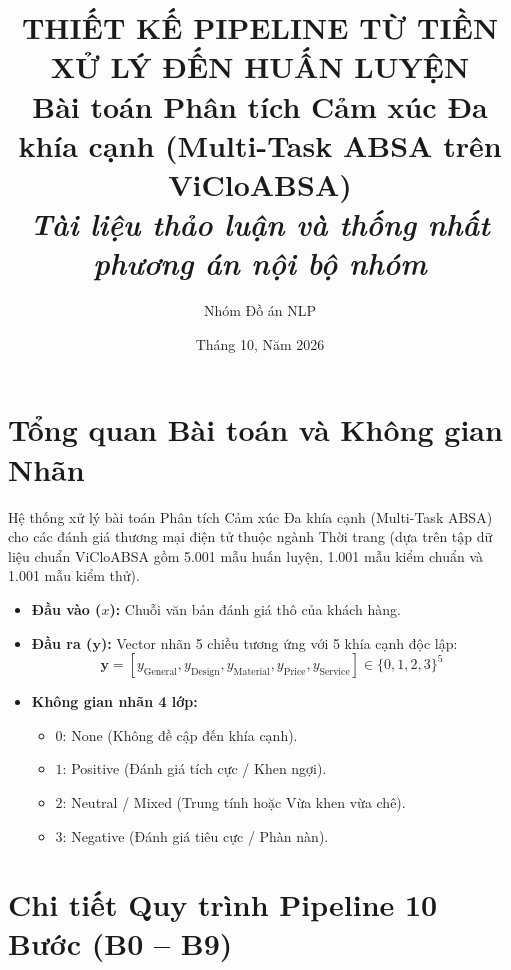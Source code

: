 \documentclass[11pt,a4paper]{article}
\begin{document}
\title{\textbf{\Large THIẾT KẾ PIPELINE TỪ TIỀN XỬ LÝ ĐẾN HUẤN LUYỆN}\\
\large Bài toán Phân tích Cảm xúc Đa khía cạnh (Multi-Task ABSA trên ViCloABSA)\\
\normalsize \textit{Tài liệu thảo luận và thống nhất phương án nội bộ nhóm}}
\author{Nhóm Đồ án NLP}
\date{Tháng 10, Năm 2026}
\maketitle

\section{Tổng quan Bài toán và Không gian Nhãn}
Hệ thống xử lý bài toán Phân tích Cảm xúc Đa khía cạnh (Multi-Task ABSA) cho các đánh giá thương mại điện tử thuộc ngành Thời trang (dựa trên tập dữ liệu chuẩn ViCloABSA gồm 5.001 mẫu huấn luyện, 1.001 mẫu kiểm chuẩn và 1.001 mẫu kiểm thử).

\begin{itemize}
    \item \textbf{Đầu vào ($x$):} Chuỗi văn bản đánh giá thô của khách hàng.
    \item \textbf{Đầu ra ($\mathbf{y}$):} Vector nhãn 5 chiều tương ứng với 5 khía cạnh độc lập:
    \begin{equation}
        \mathbf{y} = [y_{\text{General}}, y_{\text{Design}}, y_{\text{Material}}, y_{\text{Price}}, y_{\text{Service}}] \in \{0, 1, 2, 3\}^5
    \end{equation}
    \item \textbf{Không gian nhãn 4 lớp:}
    \begin{itemize}
        \item $0$: None (Không đề cập đến khía cạnh).
        \item $1$: Positive (Đánh giá tích cực / Khen ngợi).
        \item $2$: Neutral / Mixed (Trung tính hoặc Vừa khen vừa chê).
        \item $3$: Negative (Đánh giá tiêu cực / Phàn nàn).
    \end{itemize}
\end{itemize}

\section{Chi tiết Quy trình Pipeline 10 Bước (B0 -- B9)}
\end{document}
